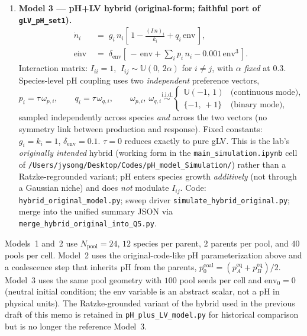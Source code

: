 \documentclass[11pt]{article}
\begin{document}
\begin{enumerate}[itemsep=6pt]
    \item \textbf{Model 3 --- pH+LV hybrid (original-form; faithful port of \texttt{gLV\_pH\_set1}).}
    \begin{align*}
        \dot n_i       &\;=\; g_i\, n_i \left[\, 1 - \frac{(I\, n)_i}{k_i} + q_i\, \mathrm{env} \,\right], \\[2pt]
        \dot{\mathrm{env}} &\;=\; \delta_{\mathrm{env}} \!\left[\, -\,\mathrm{env} + \sum_i p_i\, n_i - 0.001\, \mathrm{env}^3 \,\right].
    \end{align*}
    Interaction matrix: $I_{ii} = 1$, $\ I_{ij} \sim \mathbb{U}(0,\, 2\alpha)$ for $i \neq j$, with $\alpha$ \emph{fixed} at $0.3$. Species-level pH coupling uses two \emph{independent} preference vectors,
    \begin{equation*}
        p_i = \tau\, \omega_{p,i}, \qquad q_i = \tau\, \omega_{q,i},
        \qquad \omega_{p,i},\ \omega_{q,i} \overset{\mathrm{i.i.d.}}{\sim}
            \begin{cases}
                \mathbb{U}(-1,\,1)  & \text{(continuous mode),} \\
                \{-1,\, +1\}        & \text{(binary mode),}
            \end{cases}
    \end{equation*}
    sampled independently across species \emph{and} across the two vectors (no symmetry link between production and response). Fixed constants: $g_i = k_i = 1$, $\delta_{\mathrm{env}} = 0.1$. $\tau = 0$ reduces exactly to pure gLV. This is the lab's \emph{originally intended} hybrid (working form in the \texttt{main\_simulation.ipynb} cell of \texttt{/Users/jysong/Desktop/Codes/pH\_model\_Simulation/}) rather than a Ratzke-regrounded variant; pH enters species growth \emph{additively} (not through a Gaussian niche) and does \emph{not} modulate $I_{ij}$. Code: \texttt{hybrid\_original\_model.py}; sweep driver \texttt{simulate\_hybrid\_original.py}; merge into the unified summary JSON via \texttt{merge\_hybrid\_original\_into\_Q5.py}.
\end{enumerate}

Models~1 and~2 use $N_{\mathrm{pool}}{=}24$, $12$ species per parent, $2$ parents per pool, and $40$ pools per cell. Model~2 uses the original-code-like pH parameterization above and a coalescence step that inherits pH from the parents, $p_0^{\mathrm{coal}} = (p_A^{\mathrm{eq}} + p_B^{\mathrm{eq}})/2$. Model~3 uses the same pool geometry with $100$ pool seeds per cell and $\mathrm{env}_0 = 0$ (neutral initial condition; the env variable is an abstract scalar, not a pH in physical units). The Ratzke-grounded variant of the hybrid used in the previous draft of this memo is retained in \texttt{pH\_plus\_LV\_model.py} for historical comparison but is no longer the reference Model~3.
\end{document}
